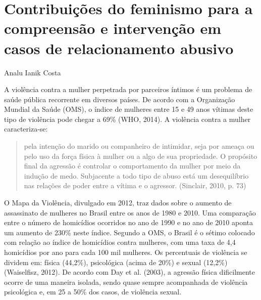 \setcounter{footnote}{0}
\setcounter{figure}{0}
\setcounter{table}{0}
\chapter*{Contribuições do feminismo para a compreensão e intervenção em casos de relacionamento abusivo}
\begin{flushright}
\begin{small}
    Analu Ianik Costa
\end{small}
\vspace{1cm}
\end{flushright}

A violência contra a mulher perpetrada por parceiros íntimos é um problema de saúde pública recorrente em diversos países. De acordo com a Organização Mundial da Saúde (OMS), o índice de mulheres entre 15 e 49 anos vítimas deste tipo de violência pode chegar a 69\% (WHO, 2014). A violência contra a mulher caracteriza-se:

\begin{quote}
    pela intenção do marido ou companheiro de intimidar, seja por ameaça ou pelo uso da força física à mulher ou a algo de sua propriedade. O propósito final da agressão é controlar o comportamento da mulher por meio da indução de medo. Subjacente a todo tipo de abuso está um desequilíbrio nas relações de poder entre a vítima e o agressor. (Sinclair, 2010, p. 73)
\end{quote}

O Mapa da Violência, divulgado em 2012, traz dados sobre o aumento de assassinato de mulheres no Brasil entre os anos de 1980 e 2010. Uma comparação entre o número de homicídios ocorridos no ano de 1990 e no ano de 2010 aponta um aumento de 230\% neste índice. Segundo a OMS, o Brasil é o sétimo colocado com relação ao índice de homicídios contra mulheres, com uma taxa de 4,4 homicídios por ano para cada 100 mil mulheres. Os percentuais de violência se dividem em: física (44,2\%), psicológica (acima de 20\%) e sexual (12,2\%) (Waiselfisz, 2012). De acordo com Day et al. (2003), a agressão física dificilmente ocorre de uma maneira isolada, sendo quase sempre acompanhada de violência psicológica e, em 25 a 50\% dos casos, de violência sexual.

